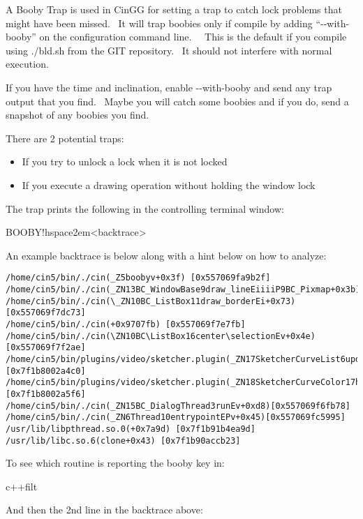 A Booby Trap is used in CinGG for setting a trap to catch lock problems that might have been missed. \ It will trap boobies only if compile by adding ``-{}-with-booby'' on the configuration command line. \ \ This is the default if you compile using ./bld.sh from the GIT repository. \ It should not interfere with normal execution.
\medskip

If you have the time and inclination, enable -{}-with-booby and send any trap output that you find. \ Maybe you will catch some boobies and if you do, send a snapshot of any boobies you find.
\medskip

There are 2 potential traps:
\begin{itemize}[nosep]
	\item If you try to unlock a lock when it is not locked
	\item If you execute a drawing operation without holding the window lock
\end{itemize}
\medskip

The trap prints the following in the controlling terminal window:
\medskip

\hspace{2em}BOOBY!hspace{2em}{\textless}backtrace{\textgreater}
\medskip

An example backtrace is below along with a hint below on how to analyze:

\begin{lstlisting}[numbers=none]
/home/cin5/bin/./cin(_Z5boobyv+0x3f) [0x557069fa9b2f] /home/cin5/bin/./cin(_ZN13BC_WindowBase9draw_lineEiiiiP9BC_Pixmap+0x3b)0x557069fb9a9b]
/home/cin5/bin/./cin(\_ZN10BC_ListBox11draw_borderEi+0x73)[0x557069f7dc73]
/home/cin5/bin/./cin(+0x9707fb) [0x557069f7e7fb]
/home/cin5/bin/./cin(\ZN10BC\ListBox16center\selectionEv+0x4e)[0x557069f7f2ae]
/home/cin5/bin/plugins/video/sketcher.plugin(_ZN17SketcherCurveList6updateEi+0x1a0)[0x7f1b8002a4c0]
/home/cin5/bin/plugins/video/sketcher.plugin(_ZN18SketcherCurveColor17handle_done_eventEi+0x76)[0x7f1b8002a5f6]
/home/cin5/bin/./cin(_ZN15BC_DialogThread3runEv+0xd8)[0x557069f6fb78]
/home/cin5/bin/./cin(_ZN6Thread10entrypointEPv+0x45)[0x557069fc5995]
/usr/lib/libpthread.so.0(+0x7a9d) [0x7f1b91b4ea9d]
/usr/lib/libc.so.6(clone+0x43) [0x7f1b90accb23]
\end{lstlisting}

To see which routine is reporting the booby key in:
\smallskip

\hspace{2em}c++filt
\smallskip

And then the 2nd line in the backtrace above:
\smallskip

